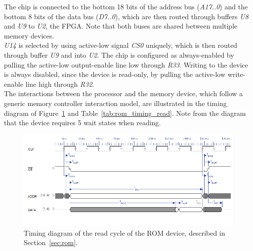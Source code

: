 \documentclass[titlepage]{scrartcl}
\begin{document}
	The chip is connected to the bottom 18 bits of the address bus (\textit{A17..0}) and the bottom 8 bits of the data bus (\textit{D7..0}), which are then routed through buffers \textit{U8} and \textit{U9} to \textit{U2}, the FPGA. Note that both buses are shared between multiple memory devices.\\

	\textit{U14} is selected by using active-low signal \textit{CS0} uniquely, which is then routed through buffer \textit{U9} and into \textit{U2}. The chip is configured as always-enabled by pulling the active-low output-enable line low through \textit{R33}. Writing to the device is always disabled, since the device is read-only, by pulling the active-low write-enable line high through \textit{R32}.\\

	The interactions between the processor and the memory device, which follow a generic memory controller interaction model, are illustrated in the timing diagram of Figure~\ref{fig:rom_timing_read} and Table~\ref{tab:rom_timing_read}. Note from the diagram that the device requires 5 wait states when reading.\\

	\begin{figure}[h!]
	\vspace{-2cm}
	\centerline{\includegraphics[width=25cm, angle=90, origin=c]{img/rom_read.png}}
		\vspace{1cm}
                	\caption{Timing diagram of the read cycle of the ROM device, described in Section~\ref{sec:rom}.}
               	\label{fig:rom_timing_read}
	\end{figure}

	\clearpage
\end{document}
